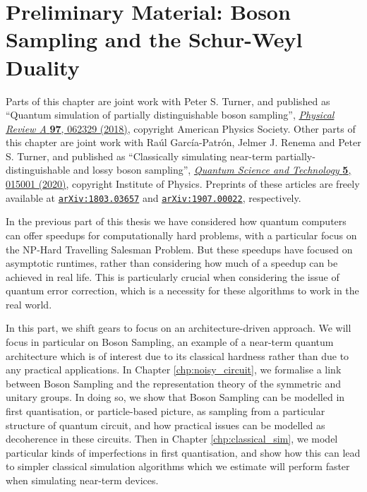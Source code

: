\chapter{Preliminary Material: Boson Sampling and the Schur-Weyl Duality}
\label{chp:preliminary_bs}

Parts of this chapter are joint work with Peter S. Turner, and published as ``Quantum simulation of partially distinguishable boson sampling'', \href{https://link.aps.org/doi/10.1103/PhysRevA.97.062329}{\textit{Physical Review A} \textbf{97}, 062329 (2018)}, copyright American Physics Society. Other parts of this chapter are joint work with Ra\'ul Garc\'ia-Patr\'on, Jelmer J. Renema and Peter S. Turner, and published as ``Classically simulating near-term partially-distinguishable and lossy boson sampling'', \href{https://iopscience.iop.org/article/10.1088/2058-9565/ab5555}{\textit{Quantum Science and Technology} \textbf{5}, 015001 (2020)}, copyright Institute of Physics. Preprints of these articles are freely available at {\tt \href{https://arxiv.org/abs/1803.03657}{arXiv:1803.03657}} and {\tt \href{https://arxiv.org/abs/1907.00022}{arXiv:1907.00022}}, respectively.

In the previous part of this thesis we have considered how quantum computers can offer speedups for computationally hard problems, with a particular focus on the NP-Hard Travelling Salesman Problem. But these speedups have focused on asymptotic runtimes, rather than considering how much of a speedup can be achieved in real life. This is particularly crucial when considering the issue of quantum error correction, which is a necessity for these algorithms to work in the real world.

In this part, we shift gears to focus on an architecture-driven approach. We will focus in particular on Boson Sampling, an example of a near-term quantum architecture which is of interest due to its classical hardness rather than due to any practical applications. In Chapter \ref{chp:noisy_circuit}, we formalise a link between Boson Sampling and the representation theory of the symmetric and unitary groups. In doing so, we show that Boson Sampling can be modelled in first quantisation, or particle-based picture, as sampling from a particular structure of quantum circuit, and how practical issues can be modelled as decoherence in these circuits. Then in Chapter \ref{chp:classical_sim}, we model particular kinds of imperfections in first quantisation, and show how this can lead to simpler classical simulation algorithms which we estimate will perform faster when simulating near-term devices.

